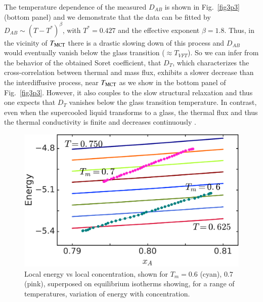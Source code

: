 The temperature dependence of the measured $D_{AB}$ is shown in Fig.~\ref{fig3p3} (bottom panel) and we demonstrate that the data can be fitted by $D_{AB} \sim (T-T^*)^{\beta}$, with $T^*=0.427$ and the effective exponent $\beta=1.8$. Thus, in the vicinity of $T_{\rm MCT}$ there is a drastic slowing down of this process and $D_{AB}$ would eventually vanish below the glass transition ($\approx{T_{VFT}}$). So we can infer from the behavior of the obtained Soret coefficient, that $D_T$, which characterizes the cross-correlation between thermal and mass flux, exhibits a slower decrease than the interdiffusive process, near $T_{\rm MCT}$ as we show in the bottom panel of Fig.~\ref{fig3p3}. {However, it also couples to the slow structural relaxation and thus one expects that $D_T$ vanishes below the glass transition temperature.} {In contrast, even when the supercooled liquid transforms to a glass, the thermal flux and thus the thermal conductivity is finite and decreases continuously \cite{bhuyan,mizuno}}.

\begin{figure}[hbt!]
    \centering
	\includegraphics[width=12cm]{figs/fig3p5.pdf}
	\caption[{\em Confirming local equilibrium in steady state: local energy vs local concentration superposed on equilibrium isotherms}]{Local energy vs local concentration, shown for $T_m=0.6$ (cyan), $0.7$ (pink), superposed on equilibrium isotherms showing, for a range of temperatures, variation of energy with concentration. \label{fig3p5}}
\end{figure}

